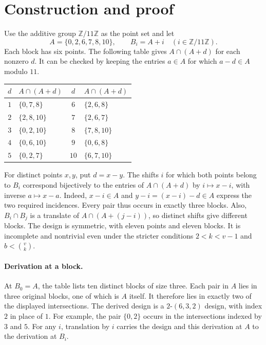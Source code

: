 \documentclass[11pt]{article}
\begin{document}
\section{Construction and proof}

Use the additive group $\mathbb{Z}/11\mathbb{Z}$ as the point set and let
\[
  A=\{0,2,6,7,8,10\},\qquad B_i=A+i\quad(i\in\mathbb{Z}/11\mathbb{Z}).
\]
Each block has six points. The following table gives $A\cap(A+d)$ for
each nonzero $d$. It can be checked by keeping the entries $a\in A$
for which $a-d\in A$ modulo $11$.

\begin{center}
\begin{tabular}{c@{\qquad}l@{\qquad}c@{\qquad}l}
\toprule
$d$ & $A\cap(A+d)$ & $d$ & $A\cap(A+d)$ \\
\midrule
$1$ & $\{0,7,8\}$  & $6$  & $\{2,6,8\}$ \\
$2$ & $\{2,8,10\}$ & $7$  & $\{2,6,7\}$ \\
$3$ & $\{0,2,10\}$ & $8$  & $\{7,8,10\}$ \\
$4$ & $\{0,6,10\}$ & $9$  & $\{0,6,8\}$ \\
$5$ & $\{0,2,7\}$  & $10$ & $\{6,7,10\}$ \\
\bottomrule
\end{tabular}
\end{center}

For distinct points $x,y$, put $d=x-y$. The shifts $i$ for which
both points belong to $B_i$ correspond bijectively to the entries
of $A\cap(A+d)$ by $i\mapsto x-i$, with inverse $a\mapsto x-a$.
Indeed, $x-i\in A$ and $y-i=(x-i)-d\in A$ express the two required
incidences. Every pair thus occurs in exactly three blocks. Also,
$B_i\cap B_j$ is a translate of $A\cap(A+(j-i))$, so distinct shifts
give different blocks. The design is symmetric, with eleven points
and eleven blocks. It is incomplete and nontrivial even under the
stricter conditions $2<k<v-1$ and $b<\binom{v}{k}$.

\paragraph{Derivation at a block.}
At $B_0=A$, the table lists ten distinct blocks of size three.
Each pair in $A$ lies in three original blocks, one of which is
$A$ itself. It therefore lies in exactly two of the displayed
intersections. The derived design is a $2$-$(6,3,2)$ design, with
index $2$ in place of $1$. For example, the pair $\{0,2\}$ occurs
in the intersections indexed by $3$ and $5$. For any $i$, translation
by $i$ carries the design and this derivation at $A$ to the derivation
at $B_i$.
\end{document}
